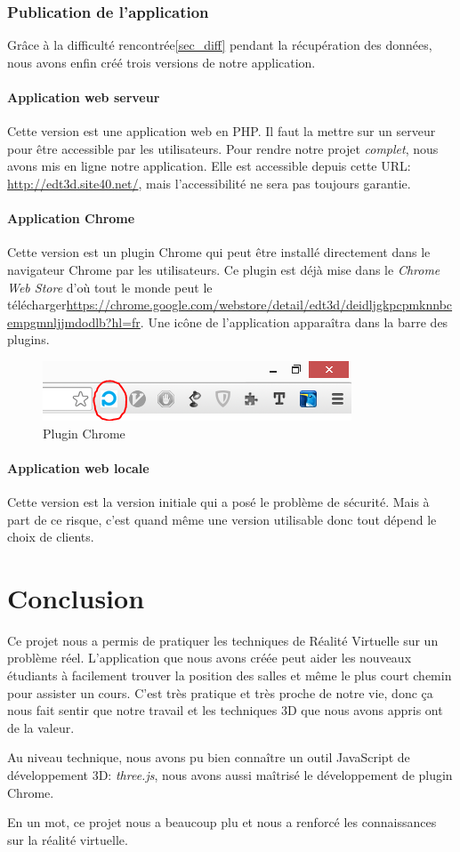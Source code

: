 \documentclass[twoside]{EPURapport}
\begin{document}
\subsection{Publication de l'application}
Grâce à la difficulté rencontrée\ref{sec_diff} pendant la récupération des données, nous avons enfin créé trois versions de notre application.

\subsubsection{Application web serveur}
Cette version est une application web en PHP. Il faut la mettre sur un serveur pour être accessible par les utilisateurs. Pour rendre notre projet \textit{complet}, nous avons mis en ligne notre application. Elle est accessible depuis cette URL: \url{http://edt3d.site40.net/}, mais l'accessibilité ne sera pas toujours garantie.

\subsubsection{Application Chrome}
Cette version est un plugin Chrome qui peut être installé directement dans le navigateur Chrome par les utilisateurs. Ce plugin est déjà mise dans le \textit{Chrome Web Store} d'où tout le monde peut le télécharger\url{https://chrome.google.com/webstore/detail/edt3d/deidljgkpcpmknnbcempgmnljjmdodlb?hl=fr}. Une icône de l'application apparaîtra dans la barre des plugins.
\begin{figure}[!htbp]
	\centering
		\includegraphics[scale=1]{img/plugin.png}
	\caption{Plugin Chrome}
	\label{fig:plugin}
\end{figure}
\bigskip

\subsubsection{Application web locale}
Cette version est la version initiale qui a posé le problème de sécurité. Mais à part de ce risque, c'est quand même une version utilisable donc tout dépend le choix de clients.

\chapter{Conclusion}
Ce projet nous a permis de pratiquer les techniques de Réalité Virtuelle sur un problème réel. L'application que nous avons créée peut aider les nouveaux étudiants à facilement trouver la position des salles et même le plus court chemin pour assister un cours. C'est très pratique et très proche de notre vie, donc ça nous fait sentir que notre travail et les techniques 3D que nous avons appris ont de la valeur.


Au niveau technique, nous avons pu bien connaître un outil JavaScript de développement 3D: \textit{three.js}, nous avons aussi maîtrisé le développement de plugin Chrome.


En un mot, ce projet nous a beaucoup plu et nous a renforcé les connaissances sur la réalité virtuelle.
\end{document}

